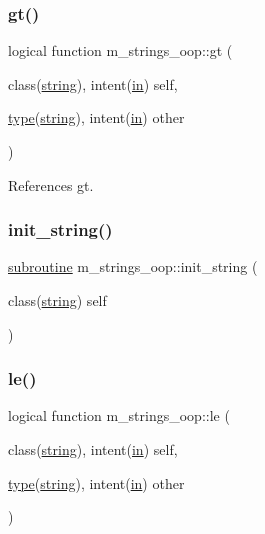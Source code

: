 \subsubsection{\texorpdfstring{gt()}{gt()}}
{\footnotesize\ttfamily logical function m\+\_\+strings\+\_\+oop\+::gt (\begin{DoxyParamCaption}\item[{class(\hyperlink{structm__strings__oop_1_1string}{string}), intent(\hyperlink{M__journal_83_8txt_afce72651d1eed785a2132bee863b2f38}{in})}]{self,  }\item[{\hyperlink{stop__watch_83_8txt_a70f0ead91c32e25323c03265aa302c1c}{type}(\hyperlink{structm__strings__oop_1_1string}{string}), intent(\hyperlink{M__journal_83_8txt_afce72651d1eed785a2132bee863b2f38}{in})}]{other }\end{DoxyParamCaption})\hspace{0.3cm}{\ttfamily [private]}}



References gt.

\mbox{\label{namespacem__strings__oop_a1510c1de10cb182598ce6a399a734be0}} 
\subsubsection{\texorpdfstring{init\+\_\+string()}{init\_string()}}
{\footnotesize\ttfamily \hyperlink{M__stopwatch_83_8txt_acfbcff50169d691ff02d4a123ed70482}{subroutine} m\+\_\+strings\+\_\+oop\+::init\+\_\+string (\begin{DoxyParamCaption}\item[{class(\hyperlink{structm__strings__oop_1_1string}{string})}]{self }\end{DoxyParamCaption})\hspace{0.3cm}{\ttfamily [private]}}

\mbox{\label{namespacem__strings__oop_a103e7c1fab92a1c4cbfff87ec8cd1e23}} 
\subsubsection{\texorpdfstring{le()}{le()}}
{\footnotesize\ttfamily logical function m\+\_\+strings\+\_\+oop\+::le (\begin{DoxyParamCaption}\item[{class(\hyperlink{structm__strings__oop_1_1string}{string}), intent(\hyperlink{M__journal_83_8txt_afce72651d1eed785a2132bee863b2f38}{in})}]{self,  }\item[{\hyperlink{stop__watch_83_8txt_a70f0ead91c32e25323c03265aa302c1c}{type}(\hyperlink{structm__strings__oop_1_1string}{string}), intent(\hyperlink{M__journal_83_8txt_afce72651d1eed785a2132bee863b2f38}{in})}]{other }\end{DoxyParamCaption})\hspace{0.3cm}{\ttfamily [private]}}

